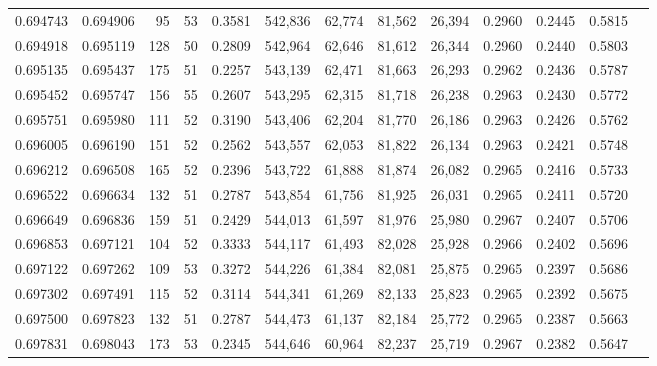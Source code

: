 \begin{tabular}{rrrrrrrrrrrrr}
0.694743 & 0.694906 &     95 &    53 &                                     0.3581 & 542,836 &  62,774 &  81,562 &  26,394 & 0.2960 & 0.2445 & 0.5815 \\
0.694918 & 0.695119 &    128 &    50 &                                     0.2809 & 542,964 &  62,646 &  81,612 &  26,344 & 0.2960 & 0.2440 & 0.5803 \\
0.695135 & 0.695437 &    175 &    51 &                                     0.2257 & 543,139 &  62,471 &  81,663 &  26,293 & 0.2962 & 0.2436 & 0.5787 \\
0.695452 & 0.695747 &    156 &    55 &                                     0.2607 & 543,295 &  62,315 &  81,718 &  26,238 & 0.2963 & 0.2430 & 0.5772 \\
0.695751 & 0.695980 &    111 &    52 &                                     0.3190 & 543,406 &  62,204 &  81,770 &  26,186 & 0.2963 & 0.2426 & 0.5762 \\
0.696005 & 0.696190 &    151 &    52 &                                     0.2562 & 543,557 &  62,053 &  81,822 &  26,134 & 0.2963 & 0.2421 & 0.5748 \\
0.696212 & 0.696508 &    165 &    52 &                                     0.2396 & 543,722 &  61,888 &  81,874 &  26,082 & 0.2965 & 0.2416 & 0.5733 \\
0.696522 & 0.696634 &    132 &    51 &                                     0.2787 & 543,854 &  61,756 &  81,925 &  26,031 & 0.2965 & 0.2411 & 0.5720 \\
0.696649 & 0.696836 &    159 &    51 &                                     0.2429 & 544,013 &  61,597 &  81,976 &  25,980 & 0.2967 & 0.2407 & 0.5706 \\
0.696853 & 0.697121 &    104 &    52 &                                     0.3333 & 544,117 &  61,493 &  82,028 &  25,928 & 0.2966 & 0.2402 & 0.5696 \\
0.697122 & 0.697262 &    109 &    53 &                                     0.3272 & 544,226 &  61,384 &  82,081 &  25,875 & 0.2965 & 0.2397 & 0.5686 \\
0.697302 & 0.697491 &    115 &    52 &                                     0.3114 & 544,341 &  61,269 &  82,133 &  25,823 & 0.2965 & 0.2392 & 0.5675 \\
0.697500 & 0.697823 &    132 &    51 &                                     0.2787 & 544,473 &  61,137 &  82,184 &  25,772 & 0.2965 & 0.2387 & 0.5663 \\
0.697831 & 0.698043 &    173 &    53 &                                     0.2345 & 544,646 &  60,964 &  82,237 &  25,719 & 0.2967 & 0.2382 & 0.5647 \\

\end{tabular}
